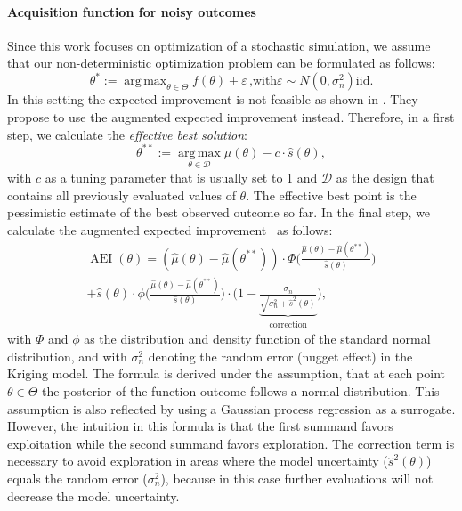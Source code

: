 \documentclass[bimj,fleqn]{w-art}
\theoremstyle{plain}
\theoremstyle{definition}
\begin{document}
\paragraph{Acquisition function for noisy outcomes}
Since this work focuses on optimization of a stochastic simulation, we assume that our non-deterministic optimization problem can be formulated as follows:
\begin{equation}
\theta^\ast := \operatorname{arg\,max}_{\theta \in \Theta} f(\theta) + \varepsilon \, \text{,with}  \varepsilon \sim N(0, \sigma^2_{n}) \text{iid.}
\end{equation}
In this setting the expected improvement is not feasible as shown in \citet{huang_global_2006}.
They propose to use the augmented expected improvement instead.
Therefore, in a first step, we calculate the \emph{effective best solution}:
\begin{equation}
  \theta^{\ast\ast} := \operatorname{arg\,max}\limits_{\theta \in \mathcal{D}} \hat{\mu}(\theta) - c \cdot \hat{s}(\theta),
\end{equation}
with $c$ as a tuning parameter that is usually set to 1 and $\mathcal{D}$ as the design that contains all previously evaluated values of $\theta$.
The effective best point is the pessimistic estimate of the best observed outcome so far.
In the final step, we calculate the augmented expected improvement~\citep{huang_global_2006} as follows:
\begin{multline}
  \label{eq:aei}
  \operatorname{AEI}(\theta) = \left( \hat{\mu}(\theta) - \hat{\mu}(\theta^{\ast\ast}) \right) \cdot  \Phi \biggl( \frac{\hat{\mu}(\theta) - \hat{\mu}(\theta^{\ast\ast})}{\hat{s}(\theta)} \biggr) \\
   + \hat{s}(\theta) \cdot \phi \biggl( \frac{\hat{\mu}(\theta) - \hat{\mu}(\theta^{\ast\ast})}{\hat{s}(\theta)} \biggr) \cdot \biggl(1 - \underbrace{\frac{\sigma_{n}}{\sqrt{\sigma_{n}^2 + \hat{s}^2(\theta)}}}_{\text{correction}}\biggr),
\end{multline}
with $\Phi$ and $\phi$ as the distribution and density function of the standard normal distribution, and
with $\sigma_{n}^2$ denoting the random error (nugget effect) in the Kriging model.
The formula is derived under the assumption, that at each point $\theta \in \Theta$ the posterior of the function outcome follows a normal distribution.
This assumption is also reflected by using a Gaussian process regression as a surrogate.
However, the intuition in this formula is that the first summand favors exploitation while the second summand favors exploration.
The correction term is necessary to avoid exploration in areas where the model uncertainty ($\hat{s}^2(\theta)$) equals the random error ($\sigma_{n}^2$), because in this case further evaluations will not decrease the model uncertainty.
\end{document}
